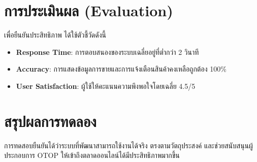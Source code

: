 \section{การประเมินผล (Evaluation)}
เพื่อยืนยันประสิทธิภาพ ได้ใช้ตัวชี้วัดดังนี้ \cite{ecommerce2019}
\begin{itemize}
  \item \textbf{Response Time}: การตอบสนองของระบบเฉลี่ยอยู่ที่ต่ำกว่า 2 วินาที
  \item \textbf{Accuracy}: การแสดงข้อมูลการขายและการแจ้งเตือนสินค้าคงเหลือถูกต้อง 100\%
  \item \textbf{User Satisfaction}: ผู้ใช้ให้คะแนนความพึงพอใจโดยเฉลี่ย 4.5/5
\end{itemize}

\section{สรุปผลการทดลอง}
การทดสอบยืนยันได้ว่าระบบที่พัฒนาสามารถใช้งานได้จริง ตรงตามวัตถุประสงค์ \cite{pressman2014}
และช่วยสนับสนุนผู้ประกอบการ OTOP ให้เข้าถึงตลาดออนไลน์ได้มีประสิทธิภาพมากขึ้น \cite{otop2020}
